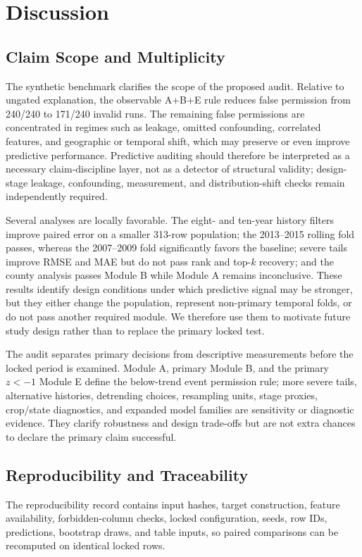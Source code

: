 \documentclass[conference]{IEEEtran}
\begin{document}
\section{Discussion}
\subsection{Claim Scope and Multiplicity}
The synthetic benchmark clarifies the scope of the proposed audit. Relative to
ungated explanation, the observable A+B+E rule reduces false permission from
240/240 to 171/240 invalid runs. The remaining false permissions are concentrated
in regimes such as leakage, omitted confounding, correlated features, and
geographic or temporal shift, which may preserve or even improve predictive
performance. Predictive auditing should therefore be interpreted as a necessary
claim-discipline layer, not as a detector of structural validity; design-stage
leakage, confounding, measurement, and distribution-shift checks remain
independently required.

Several analyses are locally favorable. The eight- and ten-year history filters
improve paired error on a smaller 313-row population; the 2013--2015 rolling fold
passes, whereas the 2007--2009 fold significantly favors the baseline; severe
tails improve RMSE and MAE but do not pass rank and top-$k$ recovery; and the county
analysis passes Module B while Module A remains inconclusive. These results
identify design conditions under which predictive signal may be stronger, but
they either change the population, represent non-primary temporal folds, or do not pass
another required module. We therefore use them to motivate future study design
rather than to replace the primary locked test.

The audit separates primary decisions from descriptive measurements before the
locked period is examined. Module A, primary Module B, and the primary $z<-1$
Module E define the below-trend event permission rule; more severe tails,
alternative histories, detrending choices, resampling units, stage proxies,
crop/state diagnostics, and expanded model families are sensitivity or diagnostic
evidence. They clarify robustness and design trade-offs but are not extra chances
to declare the primary claim successful.

\subsection{Reproducibility and Traceability}
The reproducibility record contains input hashes, target construction, feature
availability, forbidden-column checks, locked configuration, seeds, row IDs,
predictions, bootstrap draws, and table inputs, so paired comparisons can be
recomputed on identical locked rows.
\end{document}
